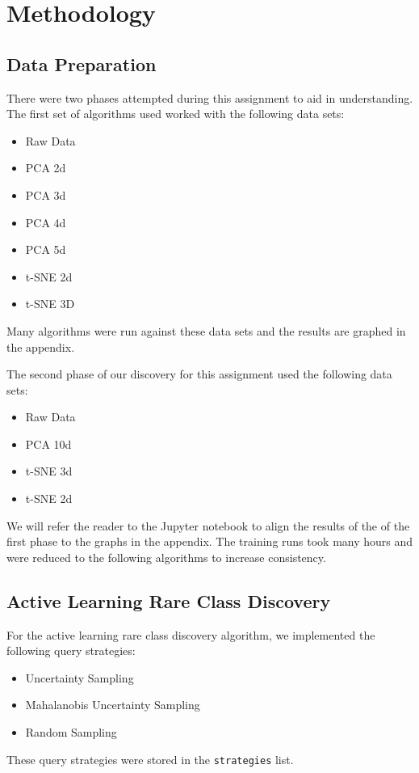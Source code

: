 \section{Methodology}

\subsection{Data Preparation}
There were two phases attempted during this assignment to aid in understanding. The first set of algorithms used worked with the following data sets: 
\begin{itemize}
    \item Raw Data
    \item PCA 2d
    \item PCA 3d
    \item PCA 4d
    \item PCA 5d
    \item t-SNE 2d
    \item t-SNE 3D
\end{itemize}

Many algorithms were run against these data sets and the results are graphed in the appendix.\par
The second phase of our discovery for this assignment used the following data sets:

\begin{itemize}
    \item Raw Data
    \item PCA 10d
    \item t-SNE 3d
    \item t-SNE 2d
\end{itemize}

We will refer the reader to the Jupyter notebook to align the results of the of the first phase to the graphs in the appendix. The training runs took many hours and were reduced to the following algorithms to increase consistency.\par


\subsection{Active Learning Rare Class Discovery}
For the active learning rare class discovery algorithm, we implemented the following query strategies:
\begin{itemize}
    \item Uncertainty Sampling
    \item Mahalanobis Uncertainty Sampling
    \item Random Sampling
\end{itemize}
These query strategies were stored in the \texttt{strategies} list.

